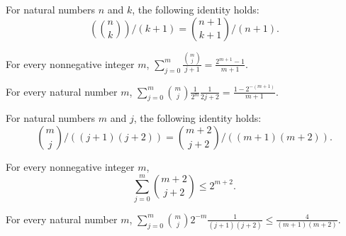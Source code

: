 \begin{theorem}
\label{FABL.cast_choose_div_succ}
\leanok
{}
For natural numbers $n$ and $k$, the following identity holds:
\[(\binom{n}{k})/ (k+1) = \binom{n+1}{k+1}/(n+1).\]
\end{theorem}

\begin{theorem}
\label{FABL.sum_cast_choose_div_succ}
\leanok
{}
For every nonnegative integer $m$,
$\displaystyle\sum_{j=0}^{m}\frac{\binom{m}{j}}{j+1}=\frac{2^{m+1}-1}{m+1}$.
\end{theorem}

\begin{theorem}
\label{FABL.binomialHalfEvenReciprocalSum_eq}
\leanok
{}
For every natural number $m$,
$\displaystyle\sum_{j=0}^{m}\binom{m}{j}\frac{1}{2^m}\frac{1}{2j+2}=\frac{1-2^{-(m+1)}}{m+1}$.
\end{theorem}

\begin{theorem}
\label{FABL.cast_choose_div_two_succs}
\leanok
{}
For natural numbers $m$ and $j$, the following identity holds:
\[\binom{m}{j}/((j+1)(j+2))=\binom{m+2}{j+2}/((m+1)(m+2)).\]
\end{theorem}

\begin{theorem}
\label{FABL.sum_shifted_choose_le_pow}
\leanok
{}
For every nonnegative integer $m$,
\[
\sum_{j=0}^{m}\binom{m+2}{j+2}\le 2^{m+2}.
\]
\end{theorem}

\begin{theorem}
\label{FABL.binomialHalfTwoSuccReciprocalSum_le}
\leanok
{}
For every natural number $m$,
$\displaystyle\sum_{j=0}^{m}\binom{m}{j}2^{-m}\frac{1}{(j+1)(j+2)}\leq
\frac{4}{(m+1)(m+2)}$.
\end{theorem}

